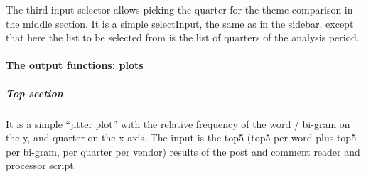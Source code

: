 \documentclass[]{article}
\newenvironment{Shaded}{\begin{snugshade}}{\end{snugshade}}
\newcommand{\KeywordTok}[1]{\textcolor[rgb]{0.13,0.29,0.53}{\textbf{{#1}}}}
\newcommand{\DataTypeTok}[1]{\textcolor[rgb]{0.13,0.29,0.53}{{#1}}}
\newcommand{\DecValTok}[1]{\textcolor[rgb]{0.00,0.00,0.81}{{#1}}}
\newcommand{\StringTok}[1]{\textcolor[rgb]{0.31,0.60,0.02}{{#1}}}
\newcommand{\CommentTok}[1]{\textcolor[rgb]{0.56,0.35,0.01}{\textit{{#1}}}}
\newcommand{\NormalTok}[1]{{#1}}
\let\oldparagraph\paragraph
\renewcommand{\paragraph}[1]{\oldparagraph{#1}\mbox{}}
\let\oldsubparagraph\subparagraph
\renewcommand{\subparagraph}[1]{\oldsubparagraph{#1}\mbox{}}
\begin{document}
\begin{Shaded}
\end{Shaded}

The third input selector allows picking the quarter for the theme
comparison in the middle section. It is a simple selectInput, the same
as in the sidebar, except that here the list to be selected from is the
list of quarters of the analysis period.

\paragraph{The output functions:
plots}\label{the-output-functions-plots}

\subparagraph{Top section}\label{top-section}

It is a simple ``jitter plot'' with the relative frequency of the word /
bi-gram on the y, and quarter on the x axis. The input is the top5 (top5
per word plus top5 per bi-gram, per quarter per vendor) results of the
post and comment reader and processor script.
\end{document}

